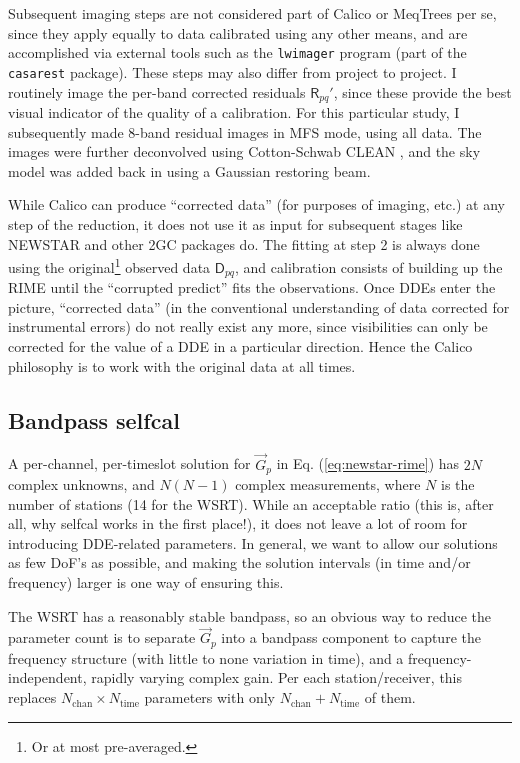 \documentclass{aa}
\newcommand{\jones}[2]{\vec {#1}_{#2}}
\newcommand{\coh}[2]{\mathsf{{#1}}_{{#2}}}
\begin{document}
Subsequent imaging steps are not considered part of Calico or MeqTrees per se, since they apply equally to data calibrated using any other means, and are accomplished via external tools such as the {\tt lwimager} program (part of the {\tt casarest} package). These steps may also differ from project to project. I routinely image the per-band corrected residuals $\coh{R}{pq}'$, since these provide the best visual indicator of the quality of a calibration. For this particular study, I subsequently made 8-band residual images in MFS mode, using all data. The images were further deconvolved using Cotton-Schwab CLEAN \citep{Schwab:csclean}, and the sky model was added back in using a Gaussian restoring beam.

While Calico can produce ``corrected data'' (for purposes of imaging, etc.) at any step of the reduction, it does not use it as input for subsequent stages like NEWSTAR and other 2GC packages do. The fitting at step 2 is always done using the original\footnote{Or at most pre-averaged.} observed data $\coh{D}{pq}$, and calibration consists of building up the RIME until the ``corrupted predict'' fits the observations. Once DDEs enter the picture, ``corrected data'' (in the conventional understanding of data corrected for instrumental errors) do not really exist any more, since visibilities can only be corrected for the value of a DDE in a particular direction. Hence the Calico philosophy is to work with the original data at all times.

\subsection{Bandpass selfcal}

A per-channel, per-timeslot solution for $\jones{G}{p}$ in Eq. (\ref{eq:newstar-rime}) has $2N$ complex unknowns, and $N(N-1)$ complex measurements, where $N$ is the number of stations (14 for the WSRT). While an acceptable ratio (this is, after all, why selfcal works in the first place!), it does not leave a lot of room for introducing DDE-related parameters. In general, we want to allow our solutions as few DoF's as possible, and making the solution intervals (in time and/or frequency) larger is one way of ensuring this.

The WSRT has a reasonably stable bandpass, so an obvious way to reduce the parameter count is to separate $\jones{G}{p}$ into a bandpass component to capture the frequency structure (with little to none variation in time), and a frequency-independent, rapidly varying complex gain. Per each station/receiver, this replaces $N_\mathrm{chan}\times N_\mathrm{time}$ parameters with only $N_\mathrm{chan}+N_\mathrm{time}$ of them.
\end{document}
